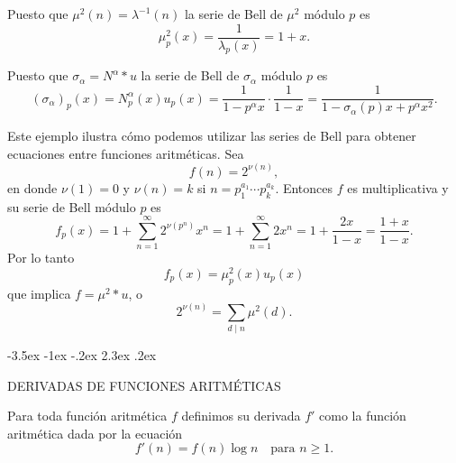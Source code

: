 \documentclass[12pt,a4paper]{book}
\makeatletter
\renewcommand\section{\@startsection{section}{1}{\z@}%
  {-3.5ex \@plus -1ex \@minus -.2ex}%
  {2.3ex \@plus .2ex}%
  {\normalfont\Large\bfseries\raggedright}}
\makeatother
\begin{document}
    \begin{ejemplo}
        Puesto que $\mu^{2}(n)=\lambda^{-1}(n)$ la serie de Bell de $\mu^{2}$ módulo $p$ es
        \begin{equation*}
            \mu_{p}^{2}(x)=\frac{1}{\lambda_{p}(x)}=1+x.
        \end{equation*}
    \end{ejemplo}

    \begin{ejemplo}
        Puesto que $\sigma_{\alpha}=N^{\alpha}*u$ la serie de Bell de $\sigma_{\alpha}$ módulo $p$
        es
        \begin{equation*}
            (\sigma_{\alpha})_{p}(x)=N_{p}^{\alpha}(x)u_{p}(x)=\frac{1}{1-p^{\alpha} x}\cdot\frac{1}{1-x}
            =\frac{1}{1-\sigma_{\alpha}(p)x+p^{\alpha} x^{2}}.
        \end{equation*}
    \end{ejemplo}

    \begin{ejemplo}
        Este ejemplo ilustra cómo podemos utilizar las series de Bell para obtener
        ecuaciones entre funciones aritméticas. Sea
        \begin{equation*}
            f(n)=2^{\nu(n)},
        \end{equation*}
        en donde $\nu(1)=0$ y $\nu(n)=k$ si $n=p_{1}^{a_{1}}\cdots p_{k}^{a_{k}}$. Entonces $f$ es
        multiplicativa y su serie de Bell módulo $p$ es
        \begin{equation*}
            f_{p}(x)=1+\sum_{n=1}^{\infty}2^{\nu(p^{n})}x^{n}=1+\sum_{n=1}^{\infty}2x^{n}
            =1+\frac{2x}{1-x}=\frac{1+x}{1-x}.
        \end{equation*}
        Por lo tanto
        \begin{equation*}
            f_{p}(x)=\mu_{p}^{2}(x)u_{p}(x)
        \end{equation*}
        que implica $f=\mu^{2}*u$, o
        \begin{equation*}
            2^{\nu(n)}=\sum_{d\mid n}\mu^{2}(d).
        \end{equation*}
    \end{ejemplo}

    \section{DERIVADAS DE FUNCIONES ARITMÉTICAS}\label{sim:der}
    \begin{definicion}
        Para toda función aritmética $f$ definimos su derivada $f'$ como la función
        aritmética dada por la ecuación
        \begin{equation*}
            f'(n)=f(n)\log n\quad\text{para } n\geq1.
        \end{equation*}
    \end{definicion}
\end{document}
